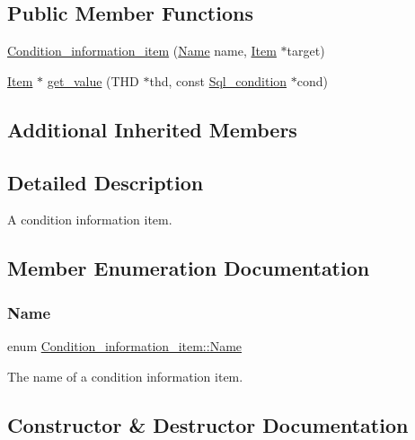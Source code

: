 \subsection*{Public Member Functions}
\begin{DoxyCompactItemize}
\item 
\mbox{\hyperlink{classCondition__information__item_a22d5f6f97c6c91d19ab2cb964e5d1ba4}{Condition\+\_\+information\+\_\+item}} (\mbox{\hyperlink{classCondition__information__item_aa66f80b798aacf01030f1e8a755e9267}{Name}} name, \mbox{\hyperlink{classItem}{Item}} $\ast$target)
\item 
\mbox{\hyperlink{classItem}{Item}} $\ast$ \mbox{\hyperlink{classCondition__information__item_a91dc6276a53028518e01554fcfde96df}{get\+\_\+value}} (T\+HD $\ast$thd, const \mbox{\hyperlink{classSql__condition}{Sql\+\_\+condition}} $\ast$cond)
\end{DoxyCompactItemize}
\subsection*{Additional Inherited Members}


\subsection{Detailed Description}
A condition information item. 

\subsection{Member Enumeration Documentation}
\mbox{\label{classCondition__information__item_aa66f80b798aacf01030f1e8a755e9267}} 
\subsubsection{\texorpdfstring{Name}{Name}}
{\footnotesize\ttfamily enum \mbox{\hyperlink{classCondition__information__item_aa66f80b798aacf01030f1e8a755e9267}{Condition\+\_\+information\+\_\+item\+::\+Name}}}

The name of a condition information item. 

\subsection{Constructor \& Destructor Documentation}
\mbox{\label{classCondition__information__item_a22d5f6f97c6c91d19ab2cb964e5d1ba4}} 
